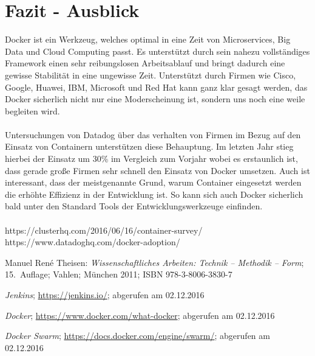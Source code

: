 \documentclass[12pt,toc=bib,toc=listof]{scrreprt}
\begin{document}
\chapter{Fazit - Ausblick} %
\label{sec:fazit}

Docker ist ein Werkzeug, welches optimal in eine Zeit von Microservices, Big Data und Cloud Computing passt.
Es unterstützt durch sein nahezu vollständiges Framework einen sehr reibungslosen Arbeitsablauf und bringt dadurch eine gewisse Stabilität in eine ungewisse Zeit.
Unterstützt durch Firmen wie Cisco, Google, Huawei, IBM, Microsoft und Red Hat kann ganz klar gesagt werden, das Docker sicherlich nicht nur eine Moderscheinung ist, sondern uns noch eine weile begleiten wird.\\
\\
Untersuchungen von Datadog über das verhalten von Firmen im Bezug auf den Einsatz von Containern unterstützen diese Behauptung.
Im letzten Jahr stieg hierbei der Einsatz um 30\% im Vergleich zum Vorjahr wobei es erstaunlich ist, dass gerade große Firmen sehr schnell den Einsatz von Docker umsetzen.
Auch ist interessant, dass der meistgenannte Grund, warum Container eingesetzt werden die erhöhte Effizienz in der Entwicklung ist.
So kann sich auch Docker sicherlich bald unter den Standard Tools der Entwicklungswerkzeuge einfinden.\\
\\





https://clusterhq.com/2016/06/16/container-survey/
https://www.datadoghq.com/docker-adoption/


\appendix
\begin{thebibliography}{99}
\raggedright
 Manuel René Theisen:
 \emph{Wissenschaftliches Arbeiten: Technik -- Methodik -- Form};
 15.~Auflage; Vahlen; München 2011;
 ISBN 978-3-8006-3830-7

 \emph{Jenkins};
 \url{https://jenkins.io/};
 abgerufen am 02.12.2016
 
 \emph{Docker};
 \url{https://www.docker.com/what-docker};
 abgerufen am 02.12.2016
 
  \emph{Docker Swarm};
 \url{https://docs.docker.com/engine/swarm/};
 abgerufen am 02.12.2016
 
 


 
 
 
 
 
 
\end{thebibliography}
\end{document}

